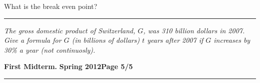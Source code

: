 \documentclass[12pt]{article}
\begin{document}
\begin{flushright}
\end{flushright}
\noindent
What is the break even point?
\vspace{3cm}

\begin{flushright}
\end{flushright}
\hrule
{\problem[10 pts] \em The gross domestic product of Switzerland, $G$,
  was 310 billion dollars in 2007.  Give a formula for $G$ (in
  billions of dollars) $t$ years after 2007 if $G$ increases by 30\% a
  year (not continuosly).}
\vspace{4cm}
\begin{flushright}
\end{flushright}
\newpage

\hfill{\large\bf First Midterm.}\hfill{\large\bf
  Spring 2012}\hfill{\large\bf Page 5/5}\hrule
\end{document}
